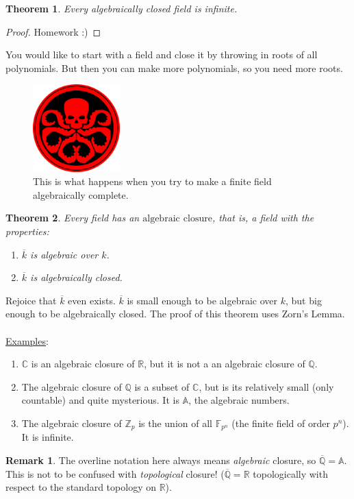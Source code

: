 \documentclass[12pt]{article}
\newcommand{\z}{\mathbb{Z}}
\newcommand{\q}{\mathbb{Q}}
\newcommand{\cx}{\mathbb{C}}
\newcommand{\real}{\mathbb{R}}
\newcommand{\field}{\mathbb{F}}
\newcommand{\ita}[1]{\textit{#1}}
\newtheorem{theorem}{Theorem}[section]
\theoremstyle{definition}
\newtheorem*{remark}{Remark}
\begin{document}
\begin{theorem}
    Every algebraically closed field is infinite.
\end{theorem}
\begin{proof}
    Homework :)
\end{proof}
You would like to start with a field and close it by throwing in roots of all polynomials. But then you can make more polynomials, so you need more roots.
\begin{figure}[H]
    \centering
    \includegraphics[width=0.3\textwidth]{13.png}
    \caption{This is what happens when you try to make a finite field algebraically complete.}
\end{figure}
\begin{theorem}
    Every field has an $\mathrm{algebraic}$ $\mathrm{closure}$, that is, a field with the properties:
    \begin{enumerate}
        \item $\overline{k}$ is algebraic over $k$.
        \item $\overline{k}$ is algebraically closed.
    \end{enumerate}
\end{theorem}
Rejoice that $\overline{k}$ even exists. $\overline{k}$ is small enough to be algebraic over $k$, but big enough to be algebraically closed. The proof of this theorem uses Zorn's Lemma.\\\\
\underline{Examples}:
\begin{enumerate}
    \item $\cx$ is an algebraic closure of $\real$, but it is not a an algebraic closure of $\q$. 
    \item The algebraic closure of $\q$ is a subset of $\cx$, but is its relatively small (only countable) and quite mysterious. It is $\mathbb{A}$, the algebraic numbers.
    \item The algebraic closure of $\z_p$ is the union of all $\field_{p^n}$ (the finite field of order $p^n$). It is infinite.
\end{enumerate}
\begin{remark}
    The overline notation here always means \ita{algebraic} closure, so $\overline{\q}=\mathbb{A}$. This is not to be confused with \ita{topological} closure! ($\overline{\q}=\real$ topologically with respect to the standard topology on $\real$).
\end{remark} 
\end{document}

